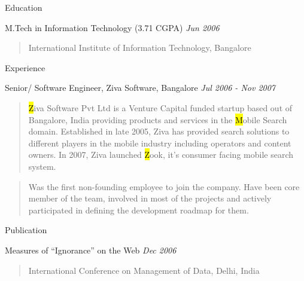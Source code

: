 \documentclass{resume}
\author{Siddhartha Reddy Kothakapu}
\newcommand{\period}{\hfill\small\sl}
\begin{document}
 \maketitle

\begin{category}{Education}{}

    \item {\topic M.Tech in Information Technology}
        {\footnotesize(3.71 CGPA)}
        {\period Jun 2006}
        \begin{quote}
            International Institute of Information Technology, Bangalore
        \end{quote}

\end{category}


\begin{category}{Experience}{}

    \item {\topic Senior/ Software Engineer,} Ziva Software, Bangalore
        {\period Jul 2006 - Nov 2007}
        \begin{quotation}
            {\hl Ziva Software Pvt Ltd} is a Venture Capital funded startup based
            out of Bangalore, India providing products and services in the {\hl
            Mobile Search} domain. Established in late 2005, Ziva has provided
            search solutions to different players in the mobile industry including
            operators and content owners. In 2007, Ziva launched {\hl Zook}, it's
            consumer facing mobile search system.
        \end{quotation}
        \begin{quotation}
            Was the first non-founding employee to join the company. Have been core
            member of the team, involved in most of the projects and actively
            participated in defining the development roadmap for them.
        \end{quotation}

\end{category}


\begin{category}{Publication}{}

    \item {\topic Measures of ``Ignorance'' on the Web}
        {\period Dec 2006}
        \begin{quote}
            International Conference on Management of Data, Delhi, India
        \end{quote}

\end{category}
\end{document}
